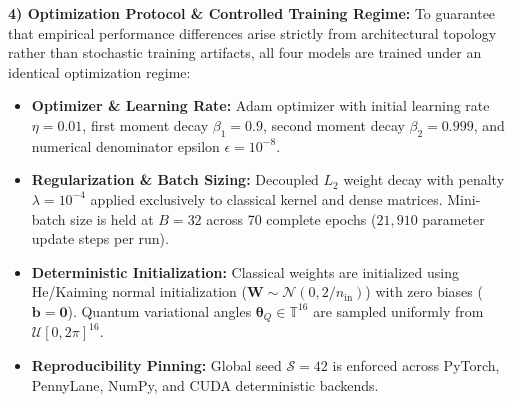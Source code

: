 \documentclass[pdflatex,sn-mathphys-num]{sn-jnl}%
\theoremstyle{thmstyleone}%
\theoremstyle{thmstyletwo}%
\theoremstyle{thmstylethree}%
\begin{document}
\textbf{4) Optimization Protocol \& Controlled Training Regime:}
To guarantee that empirical performance differences arise strictly from architectural topology rather than stochastic training artifacts, all four models are trained under an identical optimization regime:
\begin{itemize}
    \item \textbf{Optimizer \& Learning Rate:} Adam optimizer with initial learning rate $\eta = 0.01$, first moment decay $\beta_1 = 0.9$, second moment decay $\beta_2 = 0.999$, and numerical denominator epsilon $\epsilon = 10^{-8}$.
    \item \textbf{Regularization \& Batch Sizing:} Decoupled $L_2$ weight decay with penalty $\lambda = 10^{-4}$ applied exclusively to classical kernel and dense matrices. Mini-batch size is held at $B = 32$ across 70 complete epochs ($21{,}910$ parameter update steps per run).
    \item \textbf{Deterministic Initialization:} Classical weights are initialized using He/Kaiming normal initialization ($\mathbf{W} \sim \mathcal{N}(0, 2/n_{\mathrm{in}})$) with zero biases ($\mathbf{b} = \mathbf{0}$). Quantum variational angles $\boldsymbol{\theta}_Q \in \mathbb{T}^{16}$ are sampled uniformly from $\mathcal{U}[0, 2\pi]^{16}$.
    \item \textbf{Reproducibility Pinning:} Global seed $\mathcal{S} = 42$ is enforced across PyTorch, PennyLane, NumPy, and CUDA deterministic backends.
\end{itemize}
\end{document}
